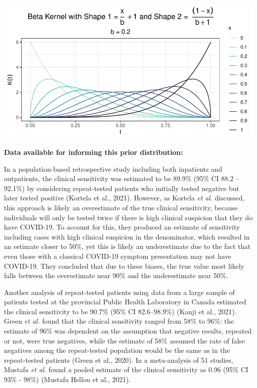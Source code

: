 \documentclass[12pt,twoside]{smiththesis}
\begin{document}
\includegraphics[width=0.8\linewidth]{thesis_files/figure-latex/unnamed-chunk-38-1}

\textbf{Data available for informing this prior distribution:}

In a population-based retrospective study including both inpatients and outpatients, the clinical sensitivity was estimated to be 89.9\% (95\% CI 88.2 -- 92.1\%) by considering repeat-tested patients who initially tested negative but later tested positive (Kortela et al., 2021). However, as Kortela \emph{et al.} discussed, this approach is likely an overestimate of the true clinical sensitivity, because individuals will only be tested twice if there is high clinical suspicion that they do have COVID-19. To account for this, they produced an estimate of sensitivity including cases with high clinical suspicion in the denominator, which resulted in an estimate closer to 50\%, yet this is likely an underestimate due to the fact that even those with a classical COVID-19 symptom presentation may not have COVID-19. They concluded that due to these biases, the true value most likely falls between the overestimate near 90\% and the underestimate near 50\%.

Another analysis of repeat-tested patients using data from a large sample of patients tested at the provincial Public Health Laboratory in Canada estimated the clinical sensitivity to be 90.7\% (95\% CI 82.6--98.9\%) (Kanji et al., 2021). Green \emph{et al.} found that the clinical sensitivity ranged from 58\% to 96\%: the estimate of 96\% was dependent on the assumption that negative results, repeated or not, were true negatives, while the estimate of 58\% assumed the rate of false negatives among the repeat-tested population would be the same as in the repeat-tested patients (Green et al., 2020). In a meta-analysis of 51 studies, Mustafa \emph{et al.} found a pooled estimate of the clinical sensitivity as 0.96 (95\% CI 93\% - 98\%) (Mustafa Hellou et al., 2021).
\end{document}
